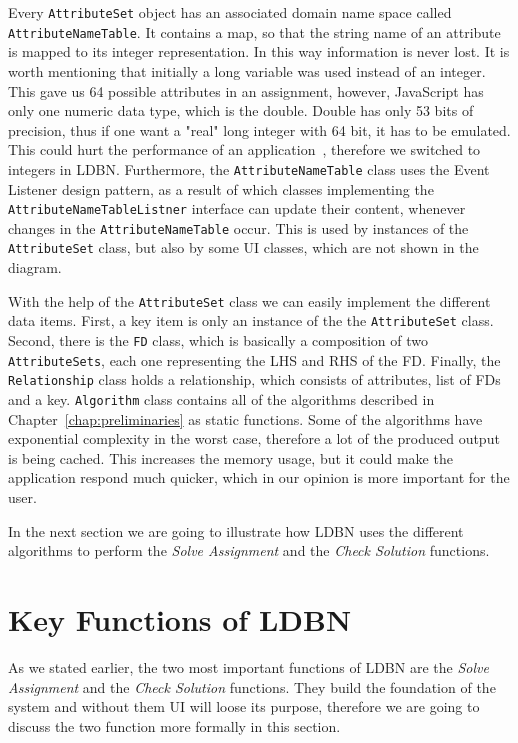 Every \verb=AttributeSet= object has an associated domain name space called 
\verb=AttributeNameTable=. 
It contains a map, so that the string name of an attribute is mapped to its 
integer representation. In this way information is never lost. It is worth mentioning 
that initially a long variable was used
instead of an integer. This gave us 64 possible attributes in an assignment, 
however, JavaScript has only one numeric data type, which is the double. 
Double has only 53 bits of precision, thus if one want a "real" long integer with 64 bit, 
it has to be emulated. This could hurt the performance of an application~\cite{wgio1}, 
therefore we switched to integers in LDBN. Furthermore, the \verb=AttributeNameTable=
class uses the Event Listener design pattern, as a result of which classes implementing 
the \verb=AttributeNameTableListner= interface can update their content,
whenever changes in the \verb=AttributeNameTable= occur. This is used by instances of the 
\verb=AttributeSet= class, but also by some UI classes, which are not shown in the diagram. 

With the help of the \verb=AttributeSet= class we can easily implement the different data items.  
First, a key item is only an instance of the the \verb=AttributeSet= class. Second, there is the
\verb=FD= class, which is basically a composition of two \verb=AttributeSets=, 
each one representing the LHS and RHS of the FD. Finally, the \verb=Relationship= class 
holds a relationship, which consists of attributes, 
list of FDs and a key. 
\verb=Algorithm= class contains all of the algorithms described in Chapter~\ref{chap:preliminaries} as
static functions. Some of the algorithms have exponential complexity in the worst
case, therefore a lot of the produced output is being cached. This increases the
memory usage, but it could make the application respond much quicker, which
in our opinion is more important for the user.    

In the next section we are going to illustrate how LDBN uses the different algorithms
to perform the \textit{Solve Assignment} and the \textit{Check Solution} functions.

\section{Key Functions of LDBN}
\label{sec:keyfunctions}
As we stated earlier, the two most important functions of LDBN are the \textit{Solve Assignment} and 
the \textit{Check Solution} functions. They build the foundation of the system and
without them UI will loose its purpose, therefore we are going to
discuss the two function more formally in this section.

